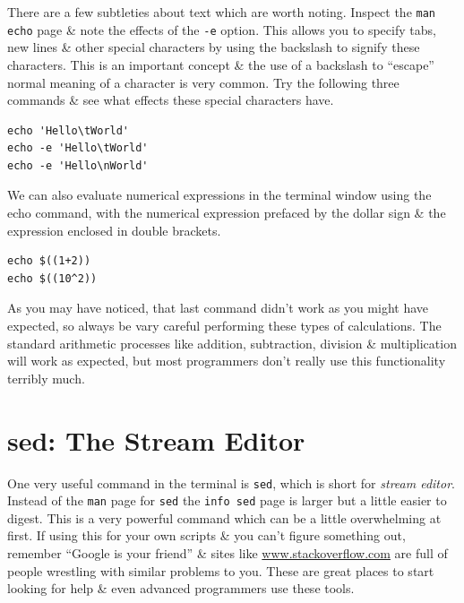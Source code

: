 \documentclass[a4paper,12pt,twoside]{memoir}
\begin{document}
\begin{information}
There are a few subtleties about text which are worth noting.
Inspect the \texttt{man echo} page \& note the effects of the \texttt{-e} option.
This allows you to specify tabs, new lines \& other special characters by using the backslash to signify these characters.
This is an important concept \& the use of a backslash to ``escape'' normal meaning of a character is very common.
Try the following three commands \& see what effects these special characters have.
\end{information}
\begin{steps}
\begin{lstlisting}
echo 'Hello\tWorld'
echo -e 'Hello\tWorld'
echo -e 'Hello\nWorld'
\end{lstlisting}
\end{steps}

\begin{steps}
We can also evaluate numerical expressions in the terminal window using the echo command, with the numerical expression prefaced by the dollar sign \& the expression enclosed in double brackets. \\
\begin{lstlisting}
echo $((1+2))
echo $((10^2))
\end{lstlisting}
As you may have noticed, that last command didn't work as you might have expected, so always be vary careful performing these types of calculations.
The standard arithmetic processes like addition, subtraction, division \& multiplication will work as expected, but most programmers don't really use this functionality terribly much.
\end{steps}

\section{sed: The Stream Editor}
\begin{information}
One very useful command in the terminal is \texttt{sed}, which is short for \textit{stream editor}.
Instead of the \texttt{man} page for \texttt{sed} the \texttt{info sed} page is larger but a little easier to digest.
This is a very powerful command which can be a little overwhelming at first.
If using this for your own scripts \& you can't figure something out, remember ``Google is your friend'' \& sites like \url{www.stackoverflow.com} are full of people wrestling with similar problems to you.
These are great places to start looking for help \& even advanced programmers use these tools. \\
\end{information}
\end{document}
